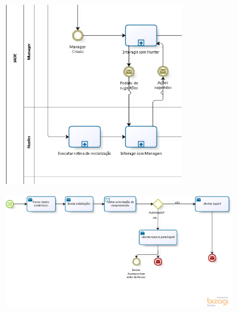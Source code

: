 \begin{apendicesenv}
\begin{itemize}
\begin{figure}[h]
\centering
\label{f6}
\includegraphics[width=0.7\textwidth]{figuras/f31}
\end{figure}

\begin{figure}[h]
\centering
\label{f7}
\includegraphics[width=0.9\textwidth]{figuras/f34}
\end{figure}



\end{itemize}
\end{apendicesenv}
